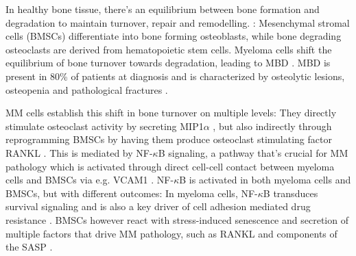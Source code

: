 In healthy bone tissue, there's an equilibrium between bone formation and
degradation to maintain turnover, repair and remodelling.
\cite{vaananenMechanismBoneTurnover1993}: Mesenchymal stromal cells (BMSCs)
differentiate into bone forming osteoblasts, while bone degrading osteoclasts
are derived from hematopoietic stem cells. Myeloma cells shift the equilibrium
of bone turnover towards degradation, leading to \ac{MBD}
\cite{hideshimaUnderstandingMultipleMyeloma2007}. MBD is present in 80\% of
patients at diagnosis and is characterized by osteolytic lesions, osteopenia and
pathological fractures \cite{terposPathogenesisBoneDisease2018}.


\ac{MM} cells establish this shift in bone turnover on multiple levels: They
directly stimulate osteoclast activity by secreting MIP1$\alpha$
\cite{obaMIP1alphaUtilizesBoth2005}, but also indirectly through reprogramming
\acp{BMSC} by having them produce osteoclast stimulating factor RANKL
\cite{tsubakiHGFMetNFkB2020}. This is mediated by NF-$\kappa$B signaling, a
pathway that's crucial for MM pathology which is activated through direct
cell-cell contact between myeloma cells and \acp{BMSC} via e.g. VCAM1
\cite{cippitelliRoleNFkBSignaling2023, royNFkBActivatingPathways2018}.
NF-$\kappa$B is activated in both myeloma cells and \acp{BMSC}, but with
different outcomes: In myeloma cells, NF-$\kappa$B transduces survival signaling
and is also a key driver of cell adhesion mediated drug resistance
\cite{royNoncanonicalNFkBMutations2017, landowskiCellAdhesionmediatedDrug2003}.
\acp{BMSC} however react with stress-induced senescence and secretion of
multiple factors that drive \ac{MM} pathology, such as RANKL and components of
the \ac{SASP} \cite{chauhanMultipleMyelomaCell1996,
    fairfieldMultipleMyelomaCells2020}.


